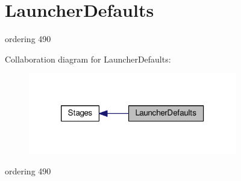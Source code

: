 \hypertarget{group__LauncherDefaults}{\section{Launcher\-Defaults}
\label{group__LauncherDefaults}
}


ordering 490  


Collaboration diagram for Launcher\-Defaults\-:
\nopagebreak
\begin{figure}[H]
\begin{center}
\leavevmode
\includegraphics[width=258pt]{group__LauncherDefaults}
\end{center}
\end{figure}
ordering 490 